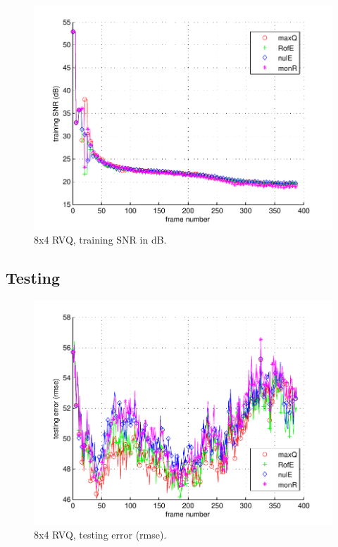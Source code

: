 								\begin{figure}[h!]
								\centering
								\includegraphics[height=0.4\textheight]{thesis/7_car11_8_4_1000_trg_SNRdB.pdf}
								\caption{8x4 RVQ, training SNR in dB.}
								\label{fig:7_car11_8_4_1000_trg_SNRdB}
								\end{figure}
\clearpage
\newpage
\subsection{Testing}
								\begin{figure}[h!]
								\centering
								\includegraphics[height=0.4\textheight]{thesis/7_car11_8_4_1000_tst_rmse.pdf}
								\caption{8x4 RVQ, testing error (rmse).}
								\label{fig:7_car11_8_4_1000_tst_rmse}
								\end{figure}


